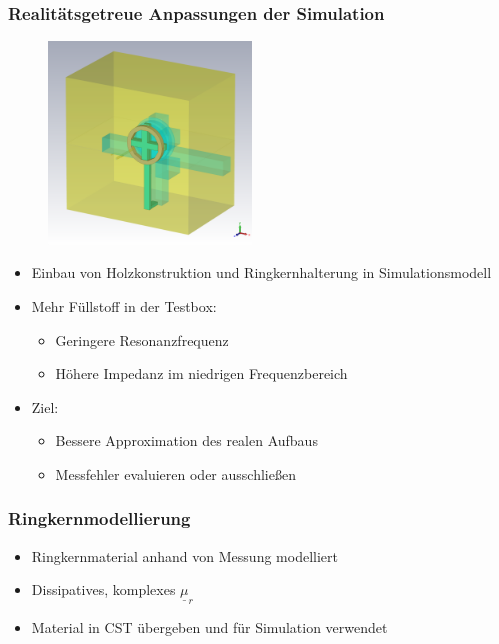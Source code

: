 \documentclass[accentcolor=tud9b, colorbacktitle, inverttitle]{tudbeamer}
\begin{document}
\begin{frame}\frametitle{Realit\"atsgetreue Anpassungen der Simulation}
\vspace{-1em}
\begin{multicols}{2}
\begin{figure}[h]
	\centering
	\includegraphics[width=0.48\textwidth]{KreuzPolygon}
\end{figure}
\vfill\null
\columnbreak
\begin{itemize}
	\item Einbau von Holzkonstruktion und Ringkernhalterung in Simulationsmodell
	\item Mehr F\"ullstoff in der Testbox:
	\begin{itemize}
		\item Geringere Resonanzfrequenz
		\item H\"ohere Impedanz im niedrigen Frequenzbereich
	\end{itemize}
	\item Ziel:
	\begin{itemize}
		\item Bessere Approximation des realen Aufbaus
		\item Messfehler evaluieren oder ausschlie\ss{}en
	\end{itemize}
\end{itemize}
\vfill\null
\end{multicols}
\end{frame}


\begin{frame}\frametitle{Ringkernmodellierung}
\begin{itemize}
	\item Ringkernmaterial anhand von Messung modelliert
	\item Dissipatives, komplexes $\underline{\mu}_r$
	\item Material in CST \"ubergeben und f\"ur Simulation verwendet
\end{itemize}
\end{frame}
\end{document}
